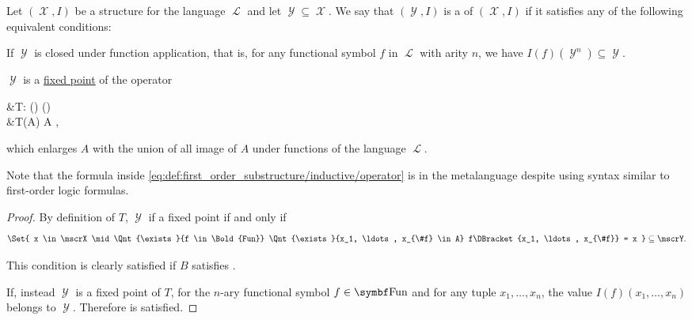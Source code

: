 \begin{definition}\label{def:first_order_substructure}
  Let \( (\mscrX, I) \) be a structure for the language \( \mscrL \) and let \( \mscrY \subseteq \mscrX \). We say that \( (\mscrY, I) \) is a  of \( (\mscrX, I) \) if it satisfies any of the following equivalent conditions:

  \begin{DefEnum}
     If \( \mscrY \) is closed under function application, that is, for any functional symbol \( f \) in \( \mscrL \) with arity \( n \), we have \( I(f)(\mscrY^n) \subseteq \mscrY \).

     \( \mscrY \) is a \hyperref[def:fixed_point]{fixed point} of the operator
    \begin{AlignedEquation}\label{eq:def:first_order_substructure/inductive/operator}
      &T: \Pow(\mscrX) \to \Pow(\mscrX) \\
      &T(A) \coloneqq A \cup {},
    \end{AlignedEquation}
    which enlarges \( A \) with the union of all image of \( A \) under functions of the language \( \mscrL \).

    Note that the formula inside \eqref{eq:def:first_order_substructure/inductive/operator} is in the metalanguage despite using syntax similar to first-order logic formulas.
  \end{DefEnum}
\end{definition}
\begin{proof}
  By definition of \( T \), \( \mscrY \) if a fixed point if and only if
  \begin{equation*}
    \Set{ x \in \mscrX \mid \Qnt{\exists}{f \in \Bold{Fun}} \Qnt{\exists}{x_1, \ldots, x_{\#f} \in A} f\DBracket{x_1, \ldots, x_{\#f}} = x } \subseteq \mscrY.
  \end{equation*}

  This condition is clearly satisfied if \( B \) satisfies .

  If, instead \( \mscrY \) is a fixed point of \( T \), for the \( n \)-ary functional symbol \( f \in \Bold{Fun} \) and for any tuple \( x_1, \ldots, x_n \), the value \( I(f)(x_1, \ldots, x_n) \) belongs to \( \mscrY \). Therefore  is satisfied.
\end{proof}

